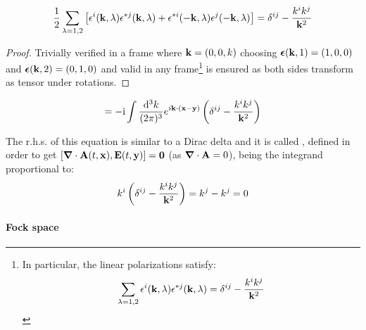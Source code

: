 %
%
\begin{lemma}[before upper = {\tcbtitle}]{}{}
  \begin{equation}
    \frac{1}{2} \sum_{\lambda = 1,2} \left[ \epsilon^i(\mathbf{k},\lambda) \epsilon^{*j}(\mathbf{k},\lambda) + \epsilon^{*i}(-\mathbf{k},\lambda) \epsilon^j(-\mathbf{k},\lambda) \right] = \delta^{ij} - \frac{k^i k^j}{\mathbf{k}^2}
  \end{equation}
\end{lemma}

\begin{proofbox}
  \begin{proof}
    Trivially verified in a frame where $ \mathbf{k} = (0,0,k) $ choosing $ \boldsymbol{\epsilon}(\mathbf{k},1) = (1,0,0) $ and $ \boldsymbol{\epsilon}(\mathbf{k},2) = (0,1,0) $ and valid in any frame\footnote{In particular, the linear polarizations satisfy:
    \begin{equation}
      \sum_{\lambda = 1,2} \epsilon^i(\mathbf{k},\lambda) \epsilon^{*j}(\mathbf{k},\lambda) = \delta^{ij} - \frac{k^i k^j}{\mathbf{k}^2}
    \end{equation}} is ensured as both sides transform as tensor under rotations.
  \end{proof}
\end{proofbox}

\begin{lemma}[before upper = {\tcbtitle}]{}{}
  \begin{equation}
    [A^i(t,\ve{x}) , E^j(t,\ve{y})] = - \img \int \frac{\dd^3k}{(2\pi)^3} e^{i \ve{k} \cdot (\ve{x} - \ve{y})} \left( \delta^{ij} - \frac{k^i k^j}{\ve{k}^2} \right)
  \end{equation}
\end{lemma}

The r.h.s. of this equation is similar to a Dirac delta and it is called , defined in order to get $ [\boldsymbol{\nabla}\cdot \mathbf{A}(t,\mathbf{x}) , \mathbf{E}(t,\mathbf{y})] = \mathbf{0} $ (as $ \boldsymbol{\nabla}\cdot \mathbf{A} = 0 $), being the integrand proportional to:
\begin{equation*}
  k^i \left( \delta^{ij} - \frac{k^i k^j}{\mathbf{k}^2} \right) = k^j - k^j = 0
\end{equation*}

\paragraph{Fock space}

